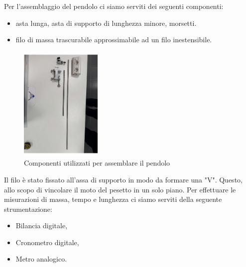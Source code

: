 \documentclass[11pt]{article}
\begin{document}
Per l'assemblaggio del pendolo ci siamo serviti dei seguenti componenti:
\begin{itemize}
    \item asta lunga, asta di supporto di lunghezza minore, morsetti.
    \item filo di massa trascurabile approssimabile ad un filo inestensibile.
\end{itemize}
\begin{figure}[H]
  \centering
  \includegraphics[width=0.35\textwidth]{pendolo.pdf}
  \caption{Componenti utilizzati per assemblare il pendolo}
\end{figure}

Il filo è stato fissato all'assa di supporto in modo da formare una "V". Questo, allo scopo di vincolare il moto del pesetto in un solo piano.
Per effettuare le misurazioni di massa, tempo e lunghezza ci siamo serviti della seguente strumentazione:
\begin{itemize}
    \item Bilancia digitale,
    \item Cronometro digitale,
    \item Metro analogico.
\end{itemize}
\end{document}

